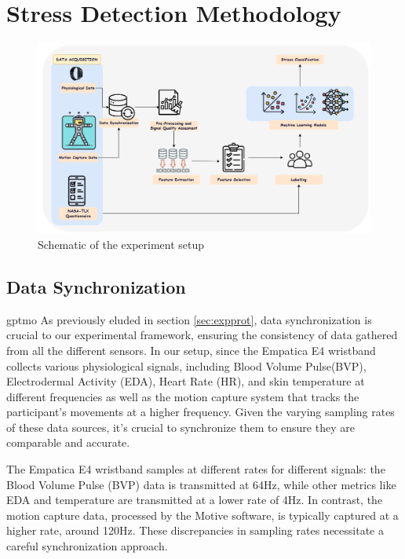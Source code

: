 \chapter{Stress Detection Methodology}


\begin{figure}[h]
	\centering
	\includegraphics[width=\columnwidth]{images/Screenshot_5.png}
	\caption{Schematic of the experiment setup}
	\label{fig:netwrok}
\end{figure}

\section{Data Synchronization} \label{sec:Synchronization} \gls*{gptmo}
As previously eluded in section \ref{sec:expprot}, data synchronization is crucial to our experimental framework, ensuring the consistency
of data gathered from all the different sensors. In our setup, since the Empatica E4 wristband collects various physiological signals, including Blood Volume Pulse(BVP), Electrodermal Activity (EDA), Heart Rate (HR), and skin temperature at different frequencies as well as the motion capture system that tracks the participant's movements at a higher frequency. Given the varying sampling rates of these data sources, it's crucial to synchronize them to ensure they are comparable and accurate.

The Empatica E4 wristband samples at different rates for different signals: the Blood Volume Pulse (BVP) data is transmitted at 64Hz, while other metrics like EDA and temperature are transmitted at a lower rate of 4Hz. In contrast, the motion capture data, processed by the Motive software, is typically captured at a higher rate, around 120Hz. These discrepancies in sampling rates necessitate a careful synchronization approach.



